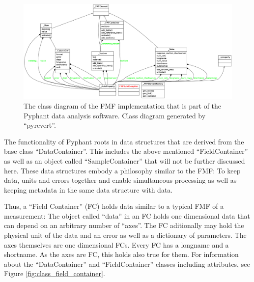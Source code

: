 \documentclass[10pt,utf8, mainlanguage=english]{ufcd-info}
\begin{document}
\begin{figure}
\includegraphics[width=\textwidth]{./classes_pyphant_fmf}
\caption{The class diagram of the FMF implementation that is part of the Pyphant data analysis software. Class diagram generated by \enquote{pyrevert}.}
\label{fig:classes_pyphant_fmf}
\end{figure}

The functionality of Pyphant roots in data structures that are derived from the base class \enquote{DataContainer}. This includes the above mentioned \enquote{FieldContainer} as well as an object called \enquote{SampleContainer} that will not be further discussed here. These data structures embody a philosophy similar to the FMF: To keep data, units and errors together and enable simultaneous processing as well as keeping metadata in the same data structure with data.

Thus, a \enquote{Field Container} (FC) holds data similar to a typical FMF of a measurement: The object called \enquote{data} in an FC holds one dimensional data that can depend on an arbitrary number of \enquote{axes}. The FC aditionally may hold the physical unit of the data and an error as well as a dictionary of parameters. The axes themselves are one dimensional FCs. Every FC has a longname and a shortname. As the axes are FC, this holds also true for them. For information about the \enquote{DataContainer} and \enquote{FieldContainer} classes including attributes, see Figure \ref{fig:class_field_container}.\\
\end{document}

